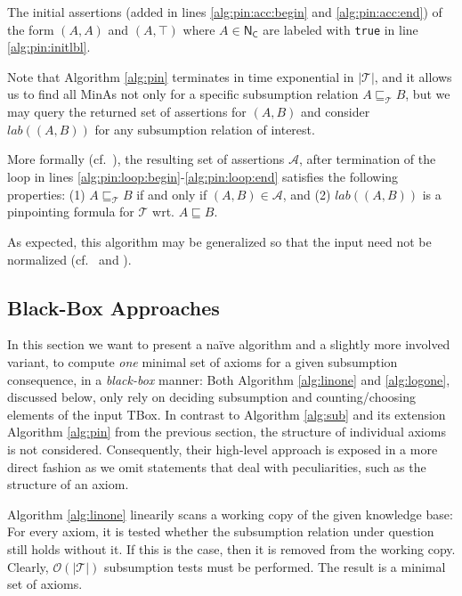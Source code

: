 \documentclass{llncs}
\newcommand{\tb}{\ensuremath{\mathcal{T}}\xspace} %
\newcommand{\nc}{\ensuremath{\mathsf{N_C}}\xspace} %
\newcommand{\subsume}{\sqsubseteq}
\begin{document}
The initial assertions (added in lines \ref{alg:pin:acc:begin} and \ref{alg:pin:acc:end}) of the form $(A, A)$ and $(A, \top)$ where $A \in \nc$ are labeled with \texttt{true} in line \ref{alg:pin:initlbl}.

Note that Algorithm \ref{alg:pin} terminates in time exponential in $|\tb|$, and it allows us to find all MinAs not only for a specific subsumption relation $A \subsume_\tb B$, but we may query the returned set of assertions for $(A, B)$ and consider $lab((A, B))$ for any subsumption relation of interest.

More formally (cf.~\cite[Thm.~2]{orig1,orig2}), the resulting set of assertions $\mathcal{A}$, after termination of the loop in lines \ref{alg:pin:loop:begin}-\ref{alg:pin:loop:end} satisfies the following properties: (1) $A \subsume_\tb B$ if and only if $(A, B) \in \mathcal{A}$, and (2) $lab((A,B))$ is a pinpointing formula for $\tb$ wrt. $A \subsume B$.

As expected, this algorithm may be generalized so that the input need not be normalized (cf.~\cite[Sec.~3]{orig1,orig2} and \cite[Sec.~5.2, p.~107]{meng-phd}).

\subsection{Black-Box Approaches}
\label{sec:black}

In this section we want to present a na\"{i}ve algorithm and a slightly more involved variant, to compute \emph{one} minimal set of axioms for a given subsumption consequence, in a \emph{black-box} manner: Both Algorithm \ref{alg:linone} and \ref{alg:logone}, discussed below, only rely on deciding subsumption and counting/choosing elements of the input TBox. In contrast to Algorithm \ref{alg:sub} and its extension Algorithm \ref{alg:pin} from the previous section, the structure of individual axioms is not considered. Consequently, their high-level approach is exposed in a more direct fashion as we omit statements that deal with peculiarities, such as the structure of an axiom.

Algorithm \ref{alg:linone} linearily scans a working copy of the given knowledge base: For every axiom, it is tested whether the subsumption relation under question still holds without it. If this is the case, then it is removed from the working copy. Clearly, $\mathcal{O}(|\tb|)$ subsumption tests must be performed. The result is a minimal set of axioms.
\end{document}
